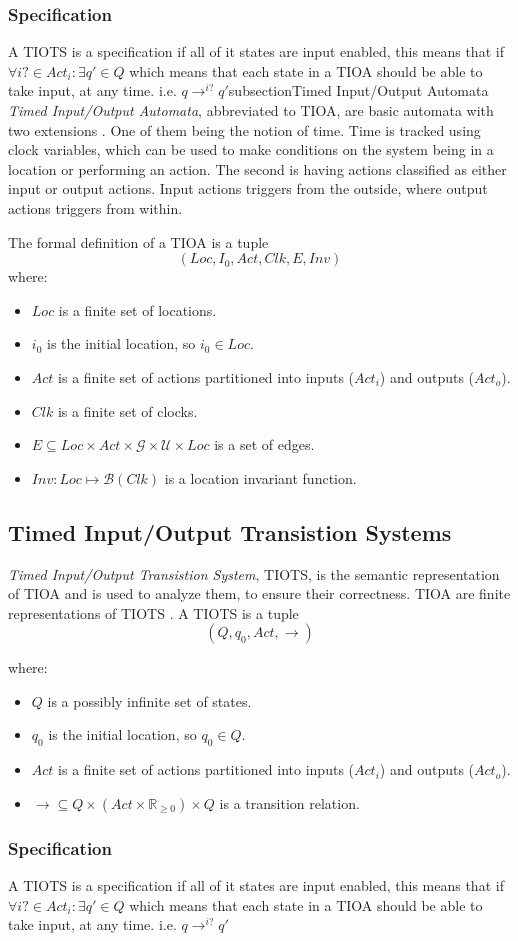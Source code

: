 \subsubsection{Specification}
A TIOTS is a specification if all of it states are input enabled, this means that if $\forall i? \in Act_i : \exists q' \in Q$ which means that each state in a TIOA should be able to take input, at any time. i.e. $q \rightarrow^{i?} q'$\cite{}subsection{Timed Input/Output Automata}\label{sec:TIOA}
\emph{Timed Input/Output Automata}, abbreviated to TIOA, are basic automata with two extensions \cite{ecdartheory}. One of them being the notion of time. Time is tracked using clock variables, which can be used to make conditions on the system being in a location or performing an action. The second is having actions classified as either input or output actions. Input actions triggers from the outside, where output actions triggers from within. 

The formal definition of a TIOA is a tuple \cite{ecdartheory} $$(Loc, I_{0}, Act, Clk, E, Inv)$$  
where:

\begin{itemize}
    \item $Loc$ is a finite set of locations.
    \item $i_{0}$ is the initial location, so $i_{0} \in Loc$.
    \item $Act$ is a finite set of actions partitioned into inputs ($Act_{i}$) and outputs ($Act_{o}$).
    \item $Clk$ is a finite set of clocks.
    \item $E \subseteq Loc \times Act \times \mathcal{G} \times \mathcal{U} \times Loc$ is a set of edges.
    \item $Inv : Loc \mapsto \mathcal{B}(Clk)$ is a location invariant function. 
\end{itemize}

\subsection{Timed Input/Output Transistion Systems}\label{sec:TIOTS}

\emph{Timed Input/Output Transistion System}, TIOTS, is the semantic representation of TIOA and is used to analyze them, to ensure their correctness. TIOA are finite representations of TIOTS \cite{}. A TIOTS is a tuple \cite{}  $$(Q, q_{0}, Act, \rightarrow)$$

where:

\begin{itemize}
    \item $Q$ is a possibly infinite set of states.
    \item $q_{0}$ is the initial location, so $q_{0} \in Q$.
    \item $Act$ is a finite set of actions partitioned into inputs ($Act_{i}$) and outputs ($Act_{o}$).
    \item $\rightarrow \subseteq Q \times (Act \times \mathbb{R}_{\geq 0}) \times Q$ is a transition relation.
\end{itemize}

\subsubsection{Specification}
A TIOTS is a specification if all of it states are input enabled, this means that if $\forall i? \in Act_i : \exists q' \in Q$ which means that each state in a TIOA should be able to take input, at any time. i.e. $q \rightarrow^{i?} q'$\cite{}
